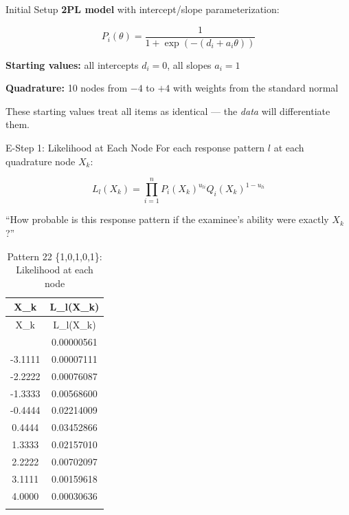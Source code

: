 \documentclass[
  ignorenonframetext,
]{beamer}
\begin{document}
\begin{frame}{Initial Setup}
\label{initial-setup}
\textbf{2PL model} with intercept/slope parameterization:

\[P_i(\theta) = \frac{1}{1 + \exp(-(d_i + a_i\theta))}\]

\textbf{Starting values:} all intercepts \(d_i = 0\), all slopes
\(a_i = 1\)

\textbf{Quadrature:} 10 nodes from \(-4\) to \(+4\) with weights from
the standard normal

These starting values treat all items as identical --- the \emph{data}
will differentiate them.
\end{frame}

\begin{frame}{E-Step 1: Likelihood at Each Node}
\label{e-step-1-likelihood-at-each-node}
For each response pattern \(l\) at each quadrature node \(X_k\):

\[L_l(X_k) = \prod_{i=1}^{n} P_i(X_k)^{u_{li}} Q_i(X_k)^{1-u_{li}}\]

``How probable is this response pattern if the examinee's ability were
exactly \(X_k\)?''

\begin{longtable}[]{@{}cc@{}}
\caption{Pattern 22 \{1,0,1,0,1\}: Likelihood at each
node}\tabularnewline
\toprule\noalign{}
X\_k & L\_l(X\_k) \\
\midrule\noalign{}
\endfirsthead
\toprule\noalign{}
X\_k & L\_l(X\_k) \\
\midrule\noalign{}
\endhead
-4.0000 & 0.00000561 \\
-3.1111 & 0.00007111 \\
-2.2222 & 0.00076087 \\
-1.3333 & 0.00568600 \\
-0.4444 & 0.02214009 \\
0.4444 & 0.03452866 \\
1.3333 & 0.02157010 \\
2.2222 & 0.00702097 \\
3.1111 & 0.00159618 \\
4.0000 & 0.00030636 \\
\bottomrule\noalign{}
\end{longtable}
\end{frame}
\end{document}
